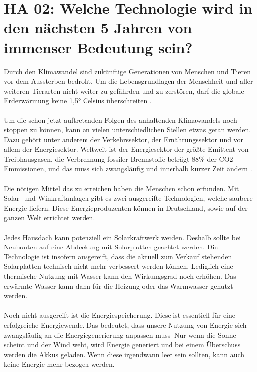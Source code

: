\section{HA 02: Welche Technologie wird in den nächsten 5 Jahren von immenser Bedeutung sein?}
  Durch den Klimawandel sind zukünftige Generationen von Menschen und Tieren vor dem Aussterben bedroht. Um die Lebensgrundlagen der Menschheit und aller weiteren Tierarten nicht weiter zu gefährden und zu zerstören, darf die globale Erderwärmung keine 1,5° Celsius überschreiten \cite{masson-delmotte_ipcc_2019}.\\\\
  Um die schon jetzt auftretenden Folgen des anhaltenden Klimawandels noch stoppen zu können, kann an vielen unterschiedlichen Stellen etwas getan werden. Dazu gehört unter anderem der Verkehrssektor, der Ernährungssektor und vor allem der Energiesektor. Weltweit ist der Energiesektor der größte Emittent von Treibhausgasen, die Verbrennung fossiler Brennstoffe beträgt 88\% der CO2-Emmissionen, und das muss sich zwangsläufig und innerhalb kurzer Zeit ändern \cite{quaschning_regenerative_2019}.\\\\
  Die nötigen Mittel das zu erreichen haben die Menschen schon erfunden. Mit Solar- und Winkraftanlagen gibt es zwei ausgereifte Technologien, welche saubere Energie liefern. Diese Energieproduzenten können in Deutschland, sowie auf der ganzen Welt errichtet werden. \\\\
  Jedes Hausdach kann potenziell ein Solarkraftwerk werden. Deshalb sollte bei Neubauten auf eine Abdeckung mit Solarplatten geachtet werden. Die Technologie ist insofern ausgereift, dass die aktuell zum Verkauf stehenden Solarplatten technisch nicht mehr verbessert werden können. Lediglich eine thermische Nutzung mit Wasser kann den Wirkungsgrad noch erhöhen. Das erwärmte Wasser kann dann für die Heizung oder das Warmwasser genutzt werden.\\\\
  Noch nicht ausgereift ist die Energiespeicherung. Diese ist essentiell für eine erfolgreiche Energiewende. Das bedeutet, dass unsere Nutzung von Energie sich zwangsläufig an die Energiegenerierung anpassen muss. Nur wenn die Sonne scheint und der Wind weht, wird Energie generiert und bei einem Überschuss werden die Akkus geladen. Wenn diese irgendwann leer sein sollten, kann auch keine Energie mehr bezogen werden.\\\\
